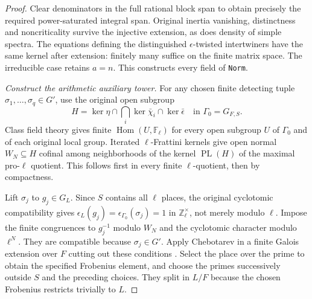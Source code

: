 \begin{proof}
Clear denominators in the full rational block span to obtain precisely
the required power-saturated integral span.  Original inertia vanishing,
distinctness and noncriticality survive the injective extension, as does
density of simple spectra.  The equations defining the distinguished
$\epsilon$-twisted intertwiners have the same kernel after extension:
finitely many suffice on the finite matrix space.  The irreducible
case retains $a=n$.  This constructs every field of \texttt{Norm}.

\emph{Construct the arithmetic auxiliary tower.}
For any chosen finite detecting tuple $\sigma_1,\ldots,\sigma_q\in G'$,
use the original open subgroup
\[
 H=\ker\eta\cap\bigcap_i\ker\bar\chi_i\cap\ker\bar\epsilon
      \quad\text{in }\Gamma_0=G_{F,S}.                    \tag{RP4}
\]
Class field theory gives finite $\operatorname{Hom}(U,\mathbb F_\ell)$
for every open subgroup $U$ of $\Gamma_0$ and of each original local
group.  Iterated $\ell$-Frattini kernels give open normal $W_N\subseteq H$
cofinal among neighborhoods of the kernel $\operatorname{PL}(H)$ of
the maximal pro-$\ell$ quotient.  This follows first in every finite
$\ell$-quotient, then by compactness.

Lift $\sigma_j$ to $g_j\in G_L$.  Since $S$ contains all $\ell$ places,
the original cyclotomic compatibility gives
$\epsilon_L(g_j)=\epsilon_{\Gamma_0}(\sigma_j)=1$ in
$\mathbb Z_\ell^\times$, not merely modulo $\ell$.
Impose the finite congruences to
$g_j^{-1}$ modulo $W_N$ and the cyclotomic character modulo $\ell^N$.
They are compatible because $\sigma_j\in G'$.  Apply Chebotarev in a
finite Galois extension over $F$ cutting out these conditions
\cite[V.3.23]{SelmerArPropCFT}.  Select the place over the prime to
obtain the specified Frobenius element, and choose the primes
successively outside $S$ and the preceding choices.  They split in
$L/F$ because the chosen Frobenius restricts trivially to $L$.


\end{proof}
